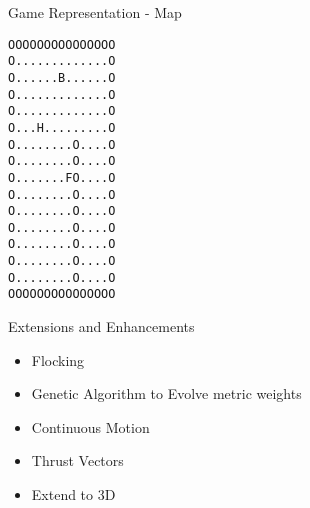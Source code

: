 \documentclass{beamer}
\begin{document}
\begin{frame}[fragile]{Game Representation - Map}
\begin{verbatim}
OOOOOOOOOOOOOOO
O.............O
O......B......O
O.............O
O.............O
O...H.........O
O........O....O
O........O....O
O.......FO....O
O........O....O
O........O....O
O........O....O
O........O....O
O........O....O
O........O....O
OOOOOOOOOOOOOOO
\end{verbatim}

 
\end{frame}


\begin{frame}{Extensions and Enhancements}
\begin{itemize}
\item Flocking
\item Genetic Algorithm to Evolve metric weights
\item Continuous Motion
\item Thrust Vectors
\item Extend to 3D

\end{itemize}
\end{frame}
\end{document}
